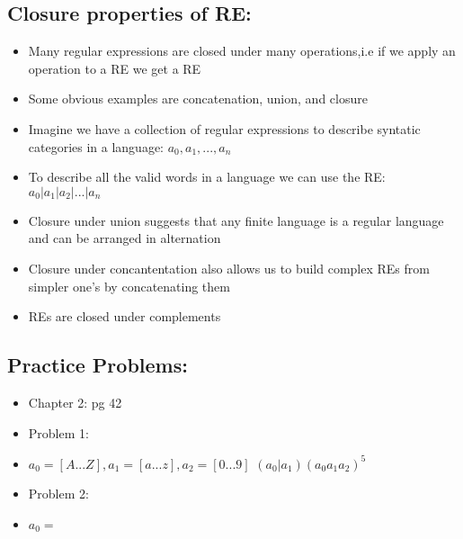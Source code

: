 \documentclass[20pt]{article}
\begin{document}
            \subsection*{Closure properties of RE:}
                    \begin{itemize}
                        \item Many regular expressions are closed under many operations,i.e if we apply an operation to a RE we get a RE
                        \item Some obvious examples are concatenation, union, and closure
                        \item Imagine we have a collection of regular expressions to describe syntatic categories in a language: $a_0, a_1,...,a_n$
                        \item To describe all the valid words in a language we can use the RE: $a_0 | a_1 | a_2|...|a_n$
                        \item Closure under union suggests that any finite language is a regular language and can be arranged in alternation
                        \item Closure under concantentation also allows us to build complex REs from simpler one's by concatenating them 
                        \item REs are closed under complements
                    \end{itemize}
            \subsection*{Practice Problems: }
                    \begin{itemize}
                        \item Chapter 2: pg 42
                        \item Problem 1:
                        \item $a_0 = [A...Z], a_1 = [a...z], a_2 = [0...9]$
                        \subitem $(a_0|a_1)(a_0a_1a_2)^5$
                        \item Problem 2:
                        \item $a_0 = {}$
                    \end{itemize}
\end{document}
